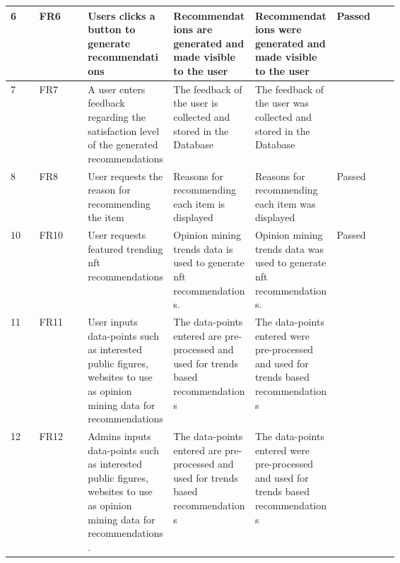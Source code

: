 \begin{longtable}{|l|l|p{0.22\linewidth}|p{0.21\linewidth}|p{0.21\linewidth}|l|}
\hline
6 & FR6 & Users clicks a button to generate recommendations & Recommendations are generated and made visible to the user & Recommendations were generated and made visible to the user & Passed \\
\hline
7 & FR7 & A user enters feedback regarding the satisfaction level of the generated recommendations & The feedback of the user is collected and stored in the Database & The feedback of the user was collected and stored in the Database & \\
\hline
8 & FR8 & User requests the reason for recommending the item & Reasons for recommending each item is displayed & Reasons for recommending each item was displayed & Passed \\
\hline
10 & FR10 & User requests featured trending \gls{nft} recommendations & Opinion mining trends data is used to generate \gls{nft} recommendations. & Opinion mining trends data was used to generate \gls{nft} recommendations. & Passed \\
\hline
11 & FR11 & User inputs data-points such as interested public figures, websites to use as opinion mining data for recommendations & The data-points entered are pre-processed and used for trends based recommendations & The data-points entered were pre-processed and used for trends based recommendations & \\ 
\hline
12 & FR12 & Admins inputs data-points such as interested public figures, websites to use as opinion mining data for recommendations. & The data-points entered are pre-processed and used for trends based recommendations & The data-points entered were pre-processed and used for trends based recommendations & \\
\hline
\end{longtable}




